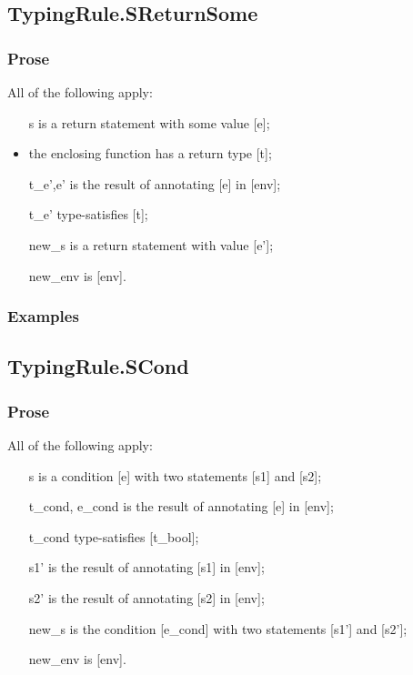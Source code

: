 \documentclass{book}
\begin{document}
\subsection{TypingRule.SReturnSome}

    \subsubsection{Prose}
    All of the following apply:
   \begin{itemize}
   \item [s] is a return statement with some value [e];
   \item the enclosing function has a return type [t];
   \item [t\_e',e'] is the result of annotating [e] in [env];
   \item [t\_e'] type-satisfies [t];
   \item [new\_s] is a return statement with value [e'];
   \item [new\_env] is [env]. 
   \end{itemize}

    \subsubsection{Examples}

\subsection{TypingRule.SCond}

    \subsubsection{Prose}
    All of the following apply:
   \begin{itemize}
   \item [s] is a condition [e] with two statements [s1] and [s2];
   \item [t\_cond, e\_cond] is the result of annotating [e] in [env];
   \item [t\_cond] type-satisfies [t\_bool]; 
   \item [s1'] is the result of annotating [s1] in [env];
   \item [s2'] is the result of annotating [s2] in [env];
   \item [new\_s] is the condition [e\_cond] with two statements [s1'] and [s2'];
   \item [new\_env] is [env].
   \end{itemize}
\end{document}

